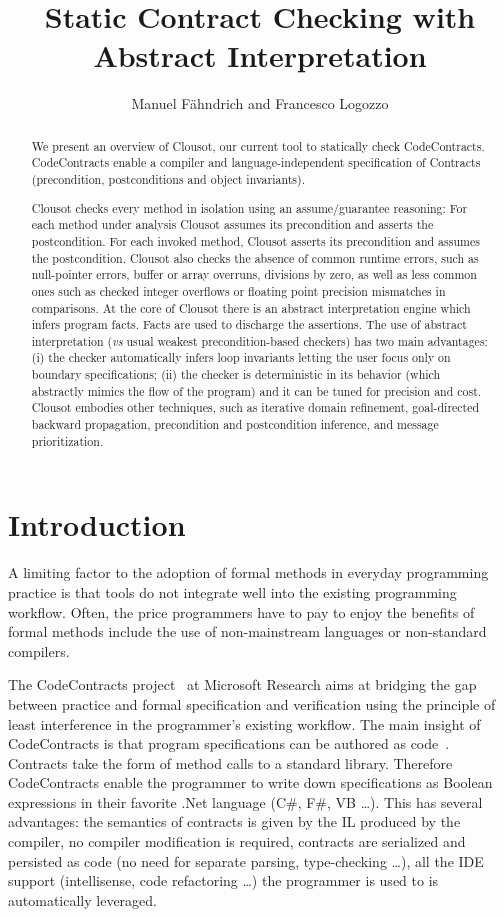 \documentclass{llncs}
\title{Static Contract Checking with Abstract Interpretation}
\author{Manuel F{\"a}hndrich and Francesco Logozzo}
\institute{Microsoft Research, Redmond, WA (USA) \\
\email{\{maf, logozzo\}@microsoft.com}
}
\begin{document}
\maketitle

\begin{abstract}
We present an overview of Clousot, our current tool to statically check CodeContracts.
CodeContracts enable a compiler and language-independent specification of Contracts (precondition, postconditions and object invariants).

Clousot checks every method in isolation using an assume/guarantee
reasoning: For each method under analysis Clousot assumes its
precondition and asserts the postcondition.  For each invoked method,
Clousot asserts its precondition and assumes the postcondition.
Clousot also checks the absence of common runtime errors, such as
null-pointer errors, buffer or array overruns, divisions by zero, as
well as less common ones such as checked integer overflows or floating
point precision mismatches in comparisons.  At the core of Clousot
there is an abstract interpretation engine which infers program facts.
Facts are used to discharge the assertions.  The use of abstract
interpretation (\emph{vs} usual weakest precondition-based checkers)
has two main advantages: (i) the checker automatically infers loop
invariants letting the user focus only on boundary specifications;
(ii) the checker is deterministic in its behavior (which abstractly
mimics the flow of the program) and it can be tuned for precision and
cost.  Clousot embodies other techniques, such as iterative domain
refinement, goal-directed backward propagation, precondition and
postcondition inference, and message prioritization.
\end{abstract}

\section{Introduction}
A limiting factor to the adoption of formal methods in everyday
programming practice is that tools do not integrate well into the
existing programming workflow.  Often, the price programmers have to
pay to enjoy the benefits of formal methods include the use of
non-mainstream languages or non-standard compilers.

The CodeContracts project~\cite{codecontracts} at Microsoft Research
aims at bridging the gap between practice and formal specification and verification
using the principle of least interference in the programmer's  existing
workflow.  The main insight of CodeContracts is that program
specifications can be authored as
code~\cite{embedded-cc-sac-oops-2010}.  Contracts take the form of method
calls to a standard library.  Therefore CodeContracts enable the
programmer to write down specifications as Boolean expressions in
their favorite .Net language (C\#, F\#, VB \dots).  This has several
advantages: the semantics of contracts is given by the IL produced by
the compiler, no compiler modification is required, contracts are
serialized and persisted as code (no need for separate parsing,
type-checking \dots), all the IDE support (intellisense, code
refactoring \dots) the programmer is used to is automatically
leveraged.
\end{document}
